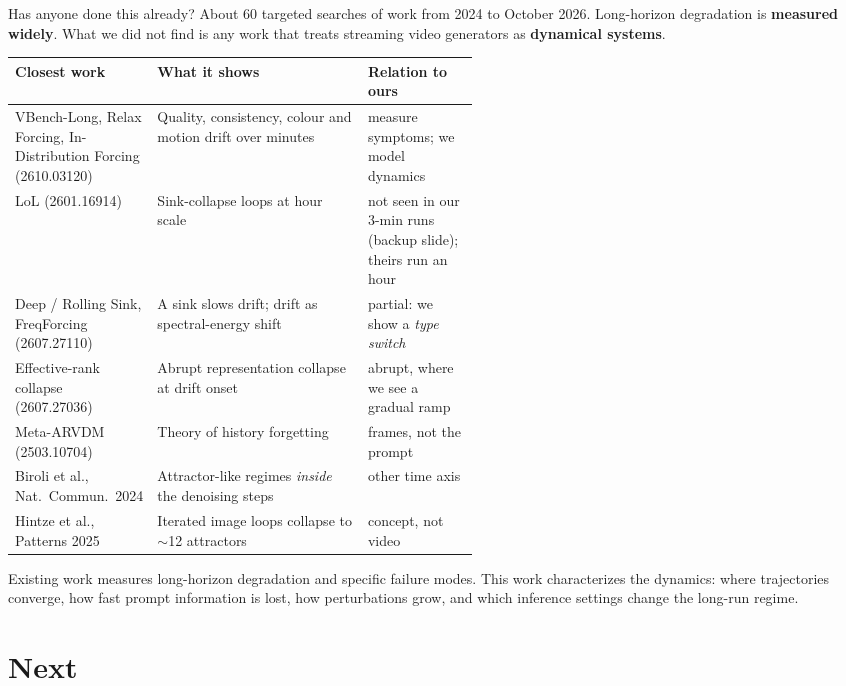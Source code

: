 \documentclass[aspectratio=169,10pt]{beamer}
\newcommand{\take}[1]{\begin{center}\colorbox{nyugreybox}{\parbox{0.94\linewidth}{\centering\small #1}}\end{center}}
\begin{document}
\begin{frame}{Has anyone done this already?}
\small
About 60 targeted searches of work from 2024 to October 2026. Long-horizon degradation is \textbf{measured widely}. What we did not find is any work that treats streaming video generators as \textbf{dynamical systems}.
\vspace{2pt}
\scriptsize
\renewcommand{\arraystretch}{1.08}
\begin{tabularx}{\linewidth}{>{\raggedright\arraybackslash}p{0.30\linewidth} X >{\raggedright\arraybackslash}p{0.24\linewidth}}
\toprule
Closest work & What it shows & Relation to ours \\
\midrule
VBench-Long, Relax Forcing, In-Distribution Forcing (2610.03120) & Quality, consistency, colour and motion drift over minutes & measure symptoms; we model dynamics \\
LoL (2601.16914) & Sink-collapse loops at hour scale & not seen in our 3-min runs (backup slide); theirs run an hour \\
Deep / Rolling Sink, FreqForcing (2607.27110) & A sink slows drift; drift as spectral-energy shift & partial: we show a \emph{type switch} \\
Effective-rank collapse (2607.27036) & Abrupt representation collapse at drift onset & abrupt, where we see a gradual ramp \\
Meta-ARVDM (2503.10704) & Theory of history forgetting & frames, not the prompt \\
Biroli et al., Nat.\ Commun.\ 2024 & Attractor-like regimes \emph{inside} the denoising steps & other time axis \\
Hintze et al., Patterns 2025 & Iterated image loops collapse to $\sim$12 attractors & concept, not video \\
\bottomrule
\end{tabularx}
\vspace{1pt}
\take{\footnotesize Existing work measures long-horizon degradation and specific failure modes. This work characterizes the dynamics: where trajectories converge, how fast prompt information is lost, how perturbations grow, and which inference settings change the long-run regime.}
\end{frame}

\section{Next}
\end{document}
